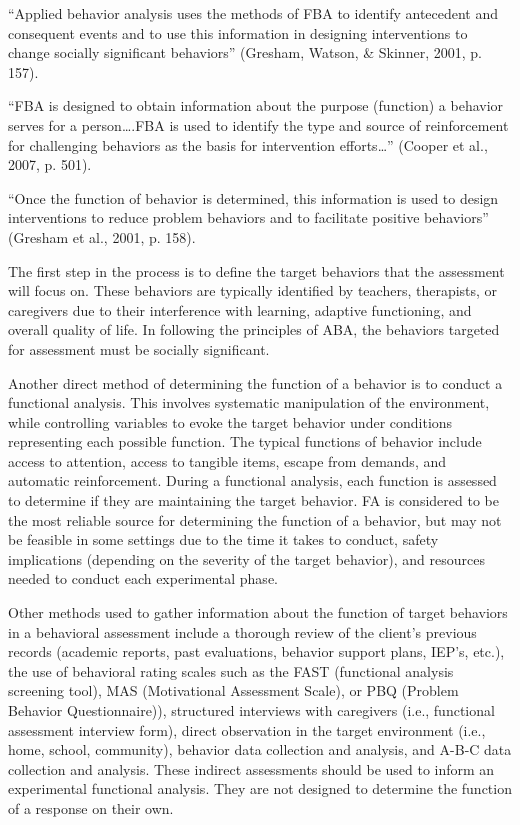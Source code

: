 ``Applied behavior analysis uses the methods of FBA to identify antecedent and consequent events and to use this information in designing interventions to change socially significant behaviors'' (Gresham, Watson, \& Skinner, 2001, p. 157).

``FBA is designed to obtain information about  the purpose (function) a behavior serves for a person….FBA is used to identify the type and source of reinforcement for challenging behaviors as the basis for intervention efforts…'' (Cooper et al., 2007, p. 501).

``Once the function of behavior is determined, this information is used to design interventions to reduce problem behaviors and to facilitate positive behaviors'' (Gresham et al., 2001, p. 158).

The first step in the process is to define the target behaviors that the assessment will focus on. These behaviors are typically identified by teachers, therapists, or caregivers due to their interference with learning, adaptive functioning, and overall quality of life. In following the principles of ABA, the behaviors targeted for assessment must be socially significant.

Another direct method of determining the function of a behavior is to conduct a functional analysis. This involves systematic manipulation of the environment, while controlling variables to evoke the target behavior under conditions representing each possible function. The typical functions of behavior include access to attention, access to tangible items, escape from demands, and automatic reinforcement. During a functional analysis, each function is assessed to determine if they are maintaining the target behavior. FA is considered to be the most reliable source for determining the function of a behavior, but may not be feasible in some settings due to the time it takes to conduct, safety implications (depending on the severity of the target behavior), and resources needed to conduct each experimental phase.

Other methods used to gather information about the function of target behaviors in a behavioral assessment include a thorough review of the client's previous records (academic reports, past evaluations, behavior support plans, IEP's, etc.), the use of behavioral rating scales such as the FAST (functional analysis screening tool), MAS (Motivational Assessment Scale), or PBQ (Problem Behavior Questionnaire)), structured interviews with caregivers (i.e., functional assessment interview form), direct observation in the target environment (i.e., home, school, community), behavior data collection and analysis, and A-B-C data collection and analysis. These indirect assessments should be used to inform an experimental functional analysis. They are not designed to determine the function of a response on their own.

